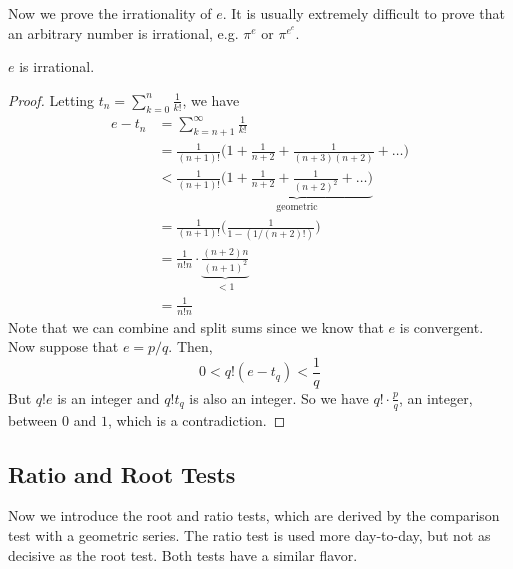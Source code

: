   Now we prove the irrationality of $e$. It is usually extremely difficult to prove that an arbitrary number is irrational, e.g. $\pi^e$ or $\pi^{e^e}$. 

  \begin{theorem}[$e$ is Irrational]
    $e$ is irrational. 
  \end{theorem}
  \begin{proof} 
    Letting $t_n = \sum_{k=0}^n \frac{1}{k!}$, we have 
    \begin{align}
      e - t_n & = \sum_{k=n+1}^\infty \frac{1}{k!} \\
              & = \frac{1}{(n+1)!} \bigg( 1 + \frac{1}{n+2} + \frac{1}{(n+3)(n+2)} + \ldots \bigg) \\
              & < \frac{1}{(n+1)!} \underbrace{\bigg( 1 + \frac{1}{n+2} + \frac{1}{(n+2)^2} + \ldots \bigg)}_{\text{geometric}} \\
              & = \frac{1}{(n+1)!} \bigg( \frac{1}{1 - (1/(n+2)!)}\bigg) \\
              & = \frac{1}{n! n} \cdot \underbrace{\frac{(n+2) n}{(n+1)^2}}_{< 1} \\
              & = \frac{1}{n! n}
    \end{align}
    Note that we can combine and split sums since we know that $e$ is convergent. Now suppose that $e = p/q$. Then, 
    \begin{equation}
      0 < q! (e - t_q) < \frac{1}{q}
    \end{equation}
    But $q! e$ is an integer and $q! t_q$ is also an integer. So we have $q! \cdot \frac{p}{q}$, an integer, between $0$ and $1$, which is a contradiction. 
  \end{proof}

\subsection{Ratio and Root Tests} 

  Now we introduce the root and ratio tests, which are derived by the comparison test with a geometric series. The ratio test is used more day-to-day, but not as decisive as the root test. Both tests have a similar flavor. 

